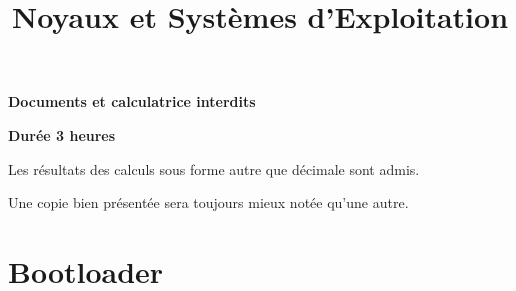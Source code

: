 %
%
%
%
%

%
%

%
%

\def\path{../../..}

%
%



%
%
\date{}
\title{Noyaux et Syst\`emes d'Exploitation}

%
%

\rhead{}

%
%
\usepackage[utf8]{inputenc}
\usepackage{enumitem}


%
%

\maketitle

%
%

\indentation{}

%
%

\begin{center}

\textbf{Documents et calculatrice interdits}

\textbf{Durée 3 heures}

\scriptsize{Les résultats des calculs sous forme autre que décimale sont admis.}

\scriptsize{Une copie bien présentée sera toujours mieux notée qu'une autre.}

\end{center}

%
%

%
%

\section{{Bootloader}
         {\hfill{} }}

